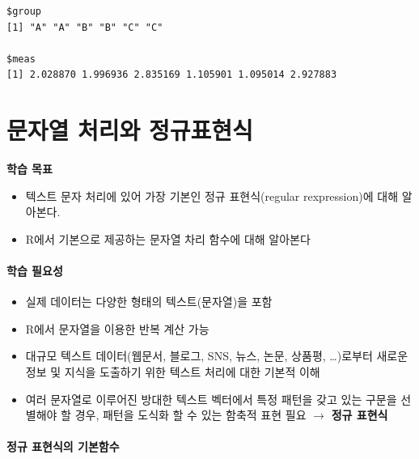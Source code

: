 \documentclass[
  11pt,
]{krantz}
\makeatletter
\providecommand{\tightlist}{%
  \setlength{\itemsep}{0pt}\setlength{\parskip}{0pt}}
\newenvironment{kframe}{%
\medskip{}
\setlength{\fboxsep}{.8em}
 \def\at@end@of@kframe{}%
 \ifinner\ifhmode%
  \def\at@end@of@kframe{\end{minipage}}%
  \begin{minipage}{\columnwidth}%
 \fi\fi%
 \def\FrameCommand##1{\hskip\@totalleftmargin \hskip-\fboxsep
 \colorbox{shadecolor}{##1}\hskip-\fboxsep
     \hskip-\linewidth \hskip-\@totalleftmargin \hskip\columnwidth}%
 \MakeFramed {\advance\hsize-\width
   \@totalleftmargin\z@ \linewidth\hsize
   \@setminipage}}%
 {\par\unskip\endMakeFramed%
 \at@end@of@kframe}
\newenvironment{rmdblock}[1]
  {
  \begin{itemize}
  \renewcommand{\labelitemi}{
    \raisebox{-.7\height}[0pt][0pt]{
      {\setkeys{Gin}{width=3em,keepaspectratio}\texttt{[image: images/\#1]}}
    }
  }
  \setlength{\fboxsep}{1em}
  \begin{kframe}
  \item
  }
  {
  \end{kframe}
  \end{itemize}
  }
\newenvironment{rmdimportant}
  {\begin{rmdblock}{important}}
  {\end{rmdblock}}
\makeatother
\begin{document}
\begin{verbatim}
$group
[1] "A" "A" "B" "B" "C" "C"

$meas
[1] 2.028870 1.996936 2.835169 1.105901 1.095014 2.927883
\end{verbatim}

\normalsize

\hypertarget{string-regexp}{%
\chapter{문자열 처리와 정규표현식}\label{string-regexp}}

\footnotesize

\begin{rmdimportant}
\textbf{학습 목표}

\begin{itemize}
\tightlist
\item
  텍스트 문자 처리에 있어 가장 기본인 정규 표현식(regular rexpression)에 대해 알아본다.
\item
  R에서 기본으로 제공하는 문자열 차리 함수에 대해 알아본다
\end{itemize}
\end{rmdimportant}

\normalsize

\hypertarget{ch03-require}{%
\subsubsection*{\texorpdfstring{\textbf{학습 필요성}}{학습 필요성}}\label{ch03-require}}


\begin{itemize}
\item
  실제 데이터는 다양한 형태의 텍스트(문자열)을 포함
\item
  R에서 문자열을 이용한 반복 계산 가능
\item
  대규모 텍스트 데이터(웹문서, 블로그, SNS, 뉴스, 논문, 상품평, \ldots)로부터 새로운 정보 및 지식을 도출하기 위한 텍스트 처리에 대한 기본적 이해
\item
  여러 문자열로 이루어진 방대한 텍스트 벡터에서 특정 패턴을 갖고 있는 구문을 선별해야 할 경우, 패턴을 도식화 할 수 있는 함축적 표현 필요 \(\rightarrow\) \textbf{정규 표현식}
\end{itemize}

\hypertarget{regex-prim-fun}{%
\subsubsection*{\texorpdfstring{\textbf{정규 표현식의 기본함수}}{정규 표현식의 기본함수}}\label{regex-prim-fun}}
\end{document}
